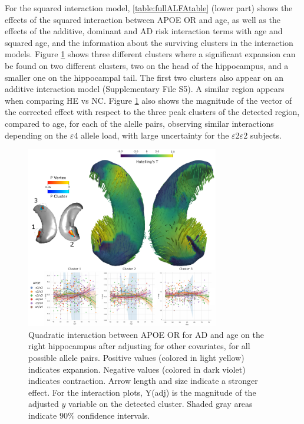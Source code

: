 For the squared interaction model, \ref{table:fullALFAtable} (lower part) shows the effects of the squared interaction between APOE OR and age, as well as the effects of the additive,  dominant and AD risk interaction terms with age and squared age, and the information about the surviving clusters in the interaction models. Figure \ref{fig:alfainteractionfig2} shows three different clusters where a significant expansion can be found on two different clusters, two on the head of the hippocampus, and a smaller one on the hippocampal tail. The first two clusters also appear on an additive interaction model (Supplementary File S5). A similar region appears when comparing HE vs NC. Figure \ref{fig:alfainteractionfig2} also shows the magnitude of the vector of the corrected effect with respect to the three peak clusters of the detected region, compared to age, for each of the alelle pairs, observing similar interactions depending on the $\varepsilon$4 allele load, with large uncertainty for the $\varepsilon$2$\varepsilon$2 subjects. \\

\begin{figure}[htbp]
  \centering
  \includegraphics[width=0.75\textwidth]{figures/hippocampus/fig_interactionapoealfa_OR.pdf}
  \caption[Quadratic interaction between APOE OR for AD and age on the right hippocampus.]{Quadratic interaction between APOE OR for AD and age on the right hippocampus after adjusting for other covariates, for all possible allele pairs. Positive values (colored in light yellow) indicates expansion. Negative values (colored in dark violet) indicates contraction. Arrow length and size indicate a stronger effect. For the interaction plots, Y(adj) is the magnitude of the adjusted $y$ variable on the detected cluster. Shaded gray areas indicate $90\%$ confidence intervals.}\label{fig:alfainteractionfig2}
\end{figure}

